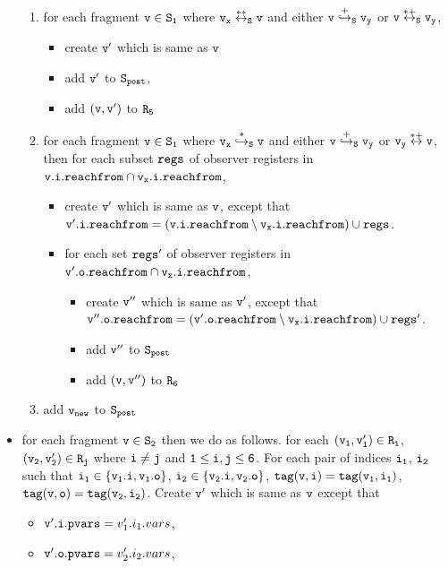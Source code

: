 \begin{itemize}
\begin{enumerate}
\item for each fragment $\tt v \in S_1$ where $\tt v_x \overset{**}\leftrightarrow_S v$ and either $\tt v \overset{+}\hookrightarrow_S v_y$ or $\tt v \overset{*+}\leftrightarrow_S v_y$, 
\begin{itemize}
\item create $\tt v'$ which is same as $\tt v$
\item  add $\tt v'$ to $\tt S_{post}$,
\item add $\tt (v,v')$ to $\tt R_5$

\end{itemize}


\item for each fragment $\tt v \in S_1$ where $\tt v_x \overset{*}\hookrightarrow_S v$ and either $\tt v \overset{+}\hookrightarrow_S v_y$ or $\tt v_y \overset{*+}\leftrightarrow v$, then for each subset $\tt regs$ of observer registers in $\tt \mathtt{v}.\mathtt{i}.\mathtt{reachfrom} \cap \tt v_x.i.reachfrom$, 
\begin{itemize}
\item create $\tt v'$ which is same as $\tt v$, except that $\mathtt{v}'.\mathtt{i}.\mathtt{reachfrom} = (\tt \mathtt{v}.\mathtt{i}.\mathtt{reachfrom} \setminus v_x.i.reachfrom) \cup regs$. 
 \item for each set $\tt regs'$ of observer registers in $\mathtt{v}'.\mathtt{o}.\mathtt{reachfrom} \cap \tt v_x.i.reachfrom$,  
\begin{itemize}
\item create $\tt v''$ which is same as $\tt v'$, except that $\tt v''.o.reachfrom = (\mathtt{v}'.\mathtt{o}.\mathtt{reachfrom} \setminus v_x.i.reachfrom) \cup regs'$. 
\item add $\tt v''$ to $\tt S_{post}$
\item add $\tt (v,v'')$ to $\tt R_6$
\end{itemize}
\end{itemize}
\item add $\tt v_{new}$ to $\tt S_{post}$ 
\end{enumerate}

\item for each fragment $\tt v \in S_2$ then we do as follows. for each $\tt (v_1,v_1') \in R_i$, $\tt (v_2,v_2') \in R_j$ where $\tt i \neq j$ and $\tt 1 \leq i,j \leq 6$. For each pair of indices $\tt i_1$, $\tt i_2$ such that $\tt i_1 \in \{v_1.i, v_1.o\}$, $\tt i_2 \in \{v_2.i, v_2.o\}$, $\tt tag(v,i) = tag(v_1, i_1)$, $\tt tag(v,o) = tag(v_2, i_2)$. Create $\tt v'$ which is same as $\tt v$ except that 
\begin{itemize}
\item $\mathtt{v}'.\mathtt{i}.\mathtt{pvars} = v_1'.i_1.vars$,
\item $\mathtt{v}'.\mathtt{o}.\mathtt{pvars} = v_2'.i_2.vars$,


\end{itemize}
\end{itemize}
